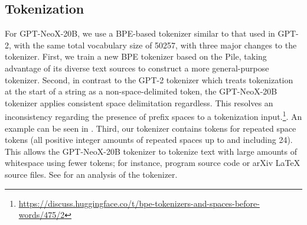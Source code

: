 \documentclass[11pt]{article}
\newcommand{\model}{GPT-NeoX-20B}
\begin{document}
\subsection{Tokenization}
\label{sec:tokenization}

For \model{}, we use a BPE-based tokenizer similar to that used in GPT-2, with the same total vocabulary size of 50257, with three major changes to the tokenizer. First, we train a new BPE tokenizer based on the Pile, taking advantage of its diverse text sources to construct a more general-purpose tokenizer. Second, in contrast to the GPT-2 tokenizer which treats tokenization at the start of a string as a non-space-delimited token, the \model{} tokenizer applies consistent space delimitation regardless. This resolves an inconsistency regarding the presence of prefix spaces to a tokenization input.\footnote{\url{https://discuss.huggingface.co/t/bpe-tokenizers-and-spaces-before-words/475/2}}. An example can be seen in .
Third, our tokenizer contains tokens for repeated space tokens (all positive  integer amounts of repeated spaces up to and including 24). This allows the \model{} tokenizer to tokenize text with large amounts of whitespace using fewer tokens; for instance, program source code or arXiv \LaTeX{} source files. See  for an analysis of the tokenizer.
\end{document}
